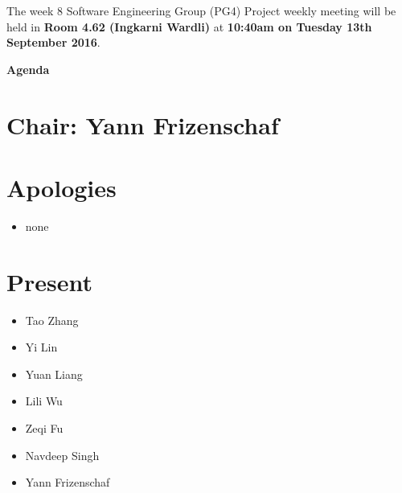 \documentclass[11pt, a4paper]{article}
\begin{document}

\noindent The week 8 Software Engineering Group (PG4) Project weekly meeting will be held in {\bf Room 4.62 (Ingkarni Wardli)} at {\bf 10:40am on Tuesday 13th September 2016}.



\vspace*{15pt}

\begin{center}

\huge \bf Agenda

\end{center}




\section*{Chair: Yann Frizenschaf}

\vspace*{10pt}




\section{Apologies}

\begin{itemize}

\item none

\end{itemize}




\section{Present}

\begin{itemize}

\item Tao Zhang

\item Yi Lin

\item Yuan Liang

\item Lili Wu

\item Zeqi Fu

\item Navdeep Singh

\item Yann Frizenschaf

\end{itemize}
\end{document}

